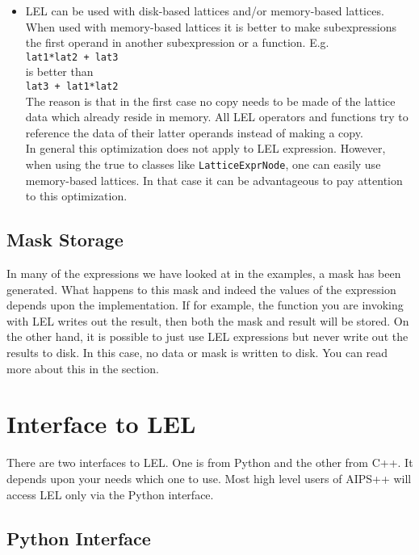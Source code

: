 \begin{itemize}
\item
LEL can be used with disk-based lattices and/or memory-based lattices.
When used with memory-based lattices it is better to make
subexpressions the first operand in another subexpression or a
function. E.g.
\\\texttt{lat1*lat2 + lat3}
\\is better than
\\\texttt{lat3 + lat1*lat2}
\\The reason is that in the first case no copy needs to be made of the
lattice data which already reside in memory. All LEL operators and
functions try to reference the data of their latter operands instead
of making a copy.
\\In general this optimization does not apply to LEL expression.
However, when using the true 
to classes like \texttt{LatticeExprNode}, one can easily use
memory-based lattices. In that case it can be advantageous to pay
attention to this optimization.

\end{itemize}

\subsection{Mask Storage}

In many of the expressions we have looked at in the examples, a mask has
been generated.  What happens to this mask and indeed the values of the
expression depends upon the implementation.  If for example, the
function you are invoking with LEL writes out the result, then both the
mask and result will be stored.  On the other hand, it is possible to
just use LEL expressions but never write out the results to disk.  In
this case, no data or mask is written to disk.   You can read
more about this in the  section.


\section{\label{LEL:PYTHONC}Interface to LEL}

There are two interfaces to LEL.  One is from Python and the
other from C++.   It depends upon your needs which one
to use.  Most high level users of AIPS++ will access
LEL only via the Python interface.

\subsection {Python Interface}

